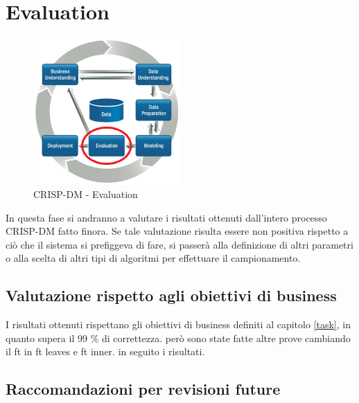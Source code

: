\chapter{Evaluation}

\begin{figure}[hbtp]
	\centering
	\includegraphics[width=0.5\textwidth]{./images/CRISPDM_5.png}
	\caption{CRISP-DM - Evaluation}
	\label{CRISPDM_5}
\end{figure}

In questa fase si andranno a valutare i risultati ottenuti dall'intero processo CRISP-DM fatto finora. Se tale valutazione risulta essere non positiva rispetto a ciò che il sistema si prefiggeva di fare, si passerà alla definizione di altri parametri o alla scelta di altri tipi di algoritmi per effettuare il campionamento.

\section{Valutazione rispetto agli obiettivi di business}

I risultati ottenuti rispettano gli obiettivi di business definiti al capitolo \ref{task}, in quanto supera il 99 \% di correttezza. però sono state fatte altre prove cambiando il ft in ft leaves e ft inner. in seguito i risultati.
\section{Raccomandazioni per revisioni future}
